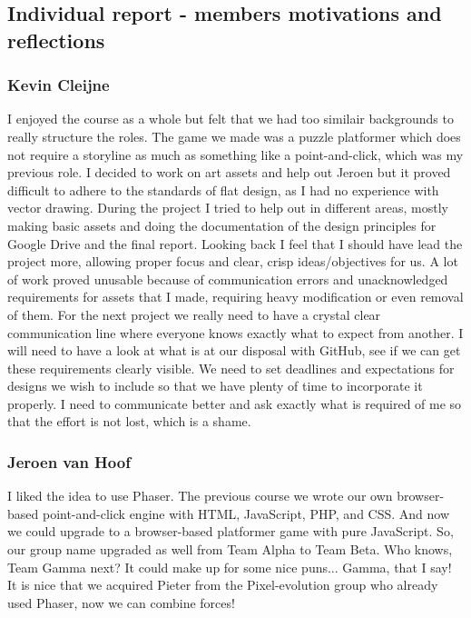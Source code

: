 \documentclass[a4paper,twoside,12pt]{article}
\begin{document}



\subsection{Individual report - members motivations and reflections}

\subsubsection{Kevin Cleijne}

I enjoyed the course as a whole but felt that we had too similair backgrounds to really structure the roles. The game we made was a puzzle platformer which does not require a 
storyline as much as something like a point-and-click, which was my previous role. I decided to work on art assets and help out Jeroen but it proved difficult to adhere to the standards of flat design, as I had no experience with vector drawing. During the project I tried to help out in different areas, mostly making basic assets and doing the documentation of the design principles for Google Drive and the final report. Looking back I feel that I should have lead the project more, allowing proper focus and clear, crisp ideas/objectives for us. A lot of work proved unusable because of communication errors and unacknowledged requirements for assets that I made, requiring heavy modification or even removal of them. For the next project we really need to have a crystal clear communication line where everyone knows exactly what to expect from another. I will need to have a look at what is at our disposal with GitHub, see if we can get these requirements clearly visible. We need to set deadlines and expectations for designs we wish to include so that we have plenty of time to incorporate it properly.
I need to communicate better and ask exactly what is required of me so that the effort is not lost, which is a shame.

\subsubsection{Jeroen van Hoof}

I liked the idea to use Phaser. The previous course we wrote our own browser-based point-and-click engine with HTML, JavaScript, PHP, and CSS. And now we could upgrade to a browser-based platformer game with pure JavaScript. So, our group name upgraded as well from Team Alpha to Team Beta. Who knows, Team Gamma next? It could make up for some nice puns... Gamma, that I say! It is nice that we acquired Pieter from the Pixel-evolution group who already used Phaser, now we can combine forces!\\
\end{document}
